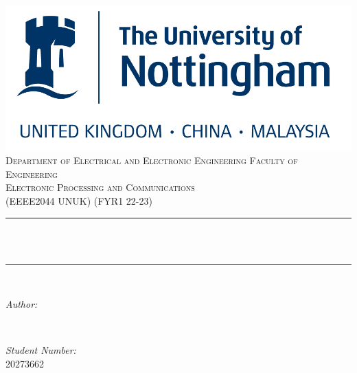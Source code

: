 \begin{titlepage}
    \centering
    \vspace*{0.5 cm}
    \includegraphics[scale = 0.4]{uon.png}\\[1.0 cm]	%

    
    \textsc{\Large Department of Electrical and Electronic Engineering
    Faculty of Engineering}\\[2.0 cm]	%
    \textsc{\large Electronic Processing and Communications}\\[0.5 cm]				%
    \textsc{\large (EEEE2044 UNUK) (FYR1 22-23)}\\[0.5 cm]				%


    \rule{\linewidth}{0.2 mm} \\[0.4 cm]
    { \huge \bfseries \thetitle}\\
    \rule{\linewidth}{0.2 mm} \\[1.5 cm]

    \begin{minipage}{0.4\textwidth}
        \begin{flushleft} \large
            \emph{Author:}\\
            \theauthor
        \end{flushleft}
    \end{minipage}~
    \begin{minipage}{0.4\textwidth}
        \begin{flushright} \large
            \emph{Student Number:} \\
            20273662									%
        \end{flushright}
    \end{minipage}\\[1.5 cm]

    {\large \thedate}\\[0 cm]

    \vfill

\end{titlepage}